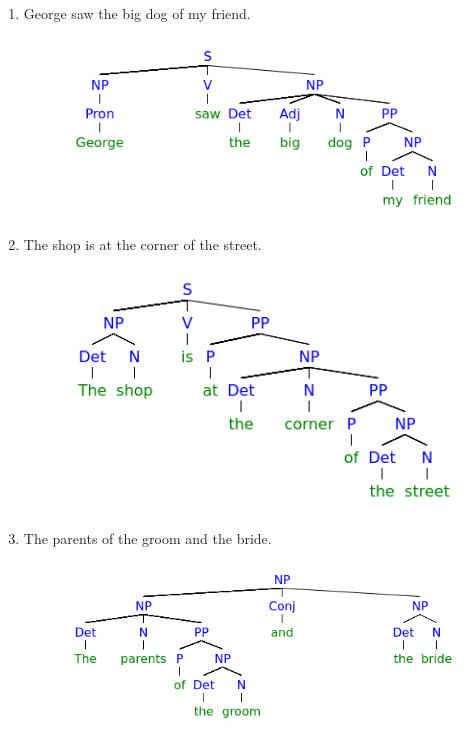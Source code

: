 \documentclass{article}
\begin{document}
\begin{enumerate}
\begin{enumerate}
\begin{figure}[H]
					\label{fig:1c}
				\end{figure}
			\item{George saw the big dog of my friend.}
				\begin{figure}[H]
					\includegraphics[width=\linewidth]{1d.png}
					\label{fig:1d}
				\end{figure}
			\item{The shop is at the corner of the street.}
				\begin{figure}[H]
					\includegraphics[width=\linewidth]{1e.png}
					\label{fig:1e}
				\end{figure}
			\item{The parents of the groom and the bride.}
				\begin{figure}[H]
					\includegraphics[width=\linewidth]{1fi.png}

\end{figure}
\end{enumerate}
\end{enumerate}
\end{document}
